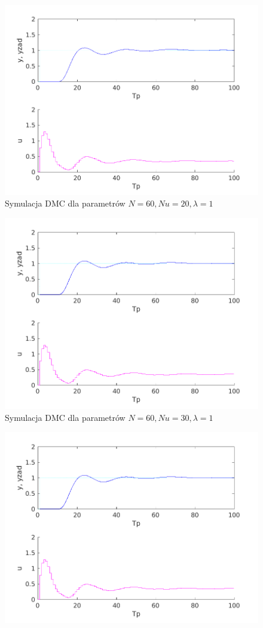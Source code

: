 \documentclass[a4paper, 10pt]{article}
\begin{document}
	\begin{figure}
		\centering
		\includegraphics[width=0.7\linewidth]{z5_60_60_20_1.png}
		\caption{Symulacja DMC dla parametrów $N=60, Nu = 20, \lambda = 1$}
		\label{fig:z5_60_60_20_1}
	\end{figure}\begin{figure}
	\centering
	\includegraphics[width=0.7\linewidth]{z5_60_60_30_1.png}
	\caption{Symulacja DMC dla parametrów $N=60, Nu = 30, \lambda = 1$}
	\label{fig:z5_60_60_30_1}
\end{figure}\begin{figure}
\centering
\includegraphics[width=0.7\linewidth]{z5_60_60_40_1.png}

\end{figure}
\end{document}
